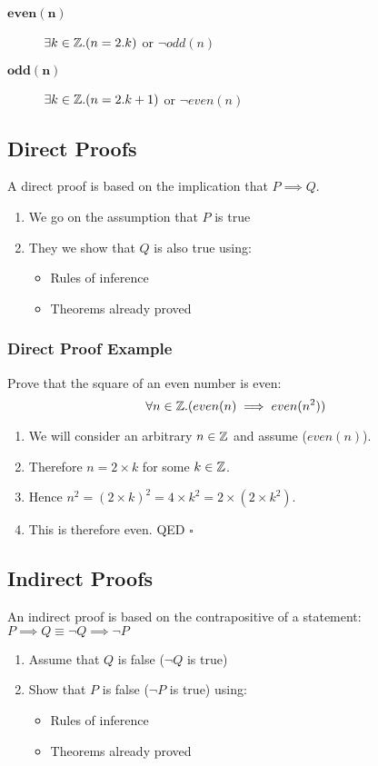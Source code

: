 \begin{description}
    \item[\(\mathbf{even(n)}\)] \(\exists k \in \mathbb{Z} . (n=2.k)\) or \(\neg odd(n)\)
    \item[\(\mathbf{odd(n)}\)] \(\exists k \in \mathbb{Z} . (n=2.k + 1)\) or \(\neg even(n)\)
\end{description}

\subsection{Direct Proofs}\label{sub:direct_proofs}

A direct proof is based on the implication that \(P \implies Q\).
\begin{enumerate}
    \item We go on the assumption that \(P\) is true
    \item They we show that \(Q\) is also true using:
          \begin{itemize}
              \item Rules of inference
              \item Theorems already proved
          \end{itemize}
\end{enumerate}

\subsubsection{Direct Proof Example}\label{ssub:direct_proof_example}

Prove that the square of an even number is even:
\[
    \forall n \in \mathbb{Z} . (even(n) \implies even(n^2))
\]
\begin{enumerate}
    \item We will consider an arbitrary \(n \in \mathbb{Z}\) and assume (\(even(n)\)).
    \item Therefore \(n = 2 \times k\) for some \(k \in \mathbb{Z}\).
    \item Hence \(n^2 = (2 \times k)^2 = 4 \times k^2 = 2 \times (2 \times k^2)\).
    \item This is therefore even. QED \(\square\)
\end{enumerate}

\subsection{Indirect Proofs}\label{sub:indirect_proofs}

An indirect proof is based on the contrapositive of a statement: \(P\implies Q \equiv \neg Q \implies \neg P\)
\begin{enumerate}
    \item Assume that \(Q\) is false (\(\neg Q\) is true)
    \item Show that \(P\) is false (\(\neg P\) is true) using:
          \begin{itemize}
              \item Rules of inference
              \item Theorems already proved
          \end{itemize}
\end{enumerate}

